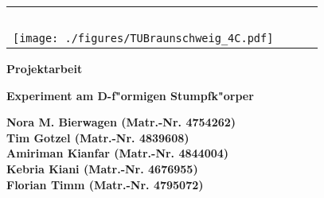 \begin{titlepage}
 \centering

\begin{table}[htbp]
 \begin{center}
 \vspace{-0.5cm}
  \begin{tabular}{lcr} 
    \parbox{0.45\textwidth}{\mbox{ }} & \parbox{0.13\textwidth}{\mbox{ }} & \parbox{0.45\textwidth}{\mbox{ }} \\
    \hspace*{-2.0cm}
    \texttt{[image: ./figures/TUBraunschweig\_4C.pdf]} & 
     &  \\ %
  \end{tabular}
 \end{center}
\end{table}


 \vspace*{2.0cm}

 \textbf{\large Projektarbeit}


 \vspace*{1.5cm}
 
 \textbf{\LARGE Experiment am D-f"ormigen Stumpfk"orper} \\[0.5ex]
 


 \vspace*{1.5cm}

 \textbf{\large Nora M. Bierwagen (Matr.-Nr. 4754262)} \\
 \textbf{\large Tim Gotzel (Matr.-Nr. 4839608)} \\
 \textbf{\large Amiriman Kianfar (Matr.-Nr. 4844004)} \\
 \textbf{\large Kebria Kiani (Matr.-Nr. 4676955)} \\
 \textbf{\large Florian Timm (Matr.-Nr. 4795072)} \\


 \vspace*{7.0cm}


\end{titlepage}
